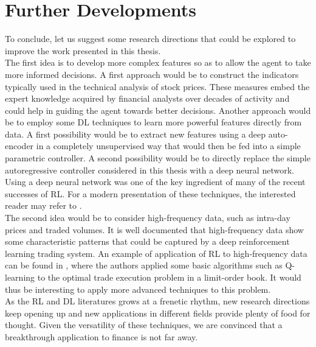 \section{Further Developments}
To conclude, let us suggest some research directions that could be explored to improve the work presented in this thesis.\\ 
The first idea is to develop more complex features so as to allow the agent to take more informed decisions. A first approach would be to construct the indicators typically used in the technical analysis of stock prices. These measures embed the expert knowledge acquired by financial analysts over decades of activity and could help in guiding the agent towards better decisions. Another approach would be to employ some \gls{DL} techniques to learn more powerful features directly from data. A first possibility would be to extract new features using a deep auto-encoder in a completely unsupervised way that would then be fed into a simple parametric controller. A second possibility would be to directly replace the simple autoregressive controller considered in this thesis with a deep neural network. Using a deep neural network was one of the key ingredient of many of the recent successes of \gls{RL}. For a modern presentation of these techniques, the interested reader may refer to \cite{Goodfellow-et-al-2016-Book}.\\
The second idea would be to consider high-frequency data, such as intra-day prices and traded volumes. It is well documented that high-frequency data show some characteristic patterns that could be captured by a deep reinforcement learning trading system. An example of application of \gls{RL} to high-frequency data can be found in \cite{nevmyvaka2006reinforcement}, where the authors applied some basic algorithms such as Q-learning to the optimal trade execution problem in a limit-order book. It would thus be interesting to apply more advanced techniques to this problem.\\
As the \gls{RL} and \gls{DL} literatures grows at a frenetic rhythm, new research directions keep opening up and new applications in different fields provide plenty of food for thought. Given the versatility of these techniques, we are convinced that a breakthrough application to finance is not far away. 


